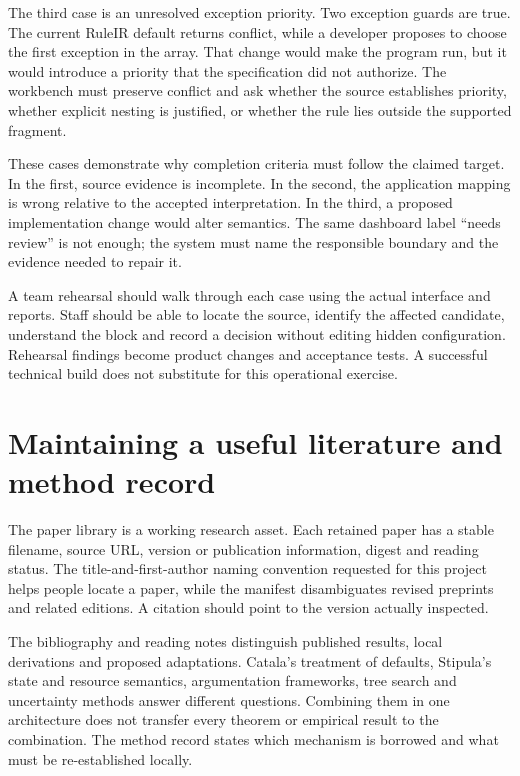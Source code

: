 \documentclass[12pt,a4paper,oneside,openany]{book}
\begin{document}
The third case is an unresolved exception priority. Two exception guards are
true. The current RuleIR default returns conflict, while a developer proposes to
choose the first exception in the array. That change would make the program run,
but it would introduce a priority that the specification did not authorize. The
workbench must preserve conflict and ask whether the source establishes priority,
whether explicit nesting is justified, or whether the rule lies outside the
supported fragment.

These cases demonstrate why completion criteria must follow the claimed target.
In the first, source evidence is incomplete. In the second, the application mapping
is wrong relative to the accepted interpretation. In the third, a proposed
implementation change would alter semantics. The same dashboard label ``needs
review'' is not enough; the system must name the responsible boundary and the
evidence needed to repair it.

A team rehearsal should walk through each case using the actual interface and
reports. Staff should be able to locate the source, identify the affected
candidate, understand the block and record a decision without editing hidden
configuration. Rehearsal findings become product changes and acceptance tests.
A successful technical build does not substitute for this operational exercise.

\section{Maintaining a useful literature and method record}
\label{merge:M10:13}


The paper library is a working research asset. Each retained paper has a stable
filename, source URL, version or publication information, digest and reading
status. The title-and-first-author naming convention requested for this project
helps people locate a paper, while the manifest disambiguates revised preprints
and related editions. A citation should point to the version actually inspected.

The bibliography and reading notes distinguish published results, local
derivations and proposed adaptations. Catala's treatment of defaults, Stipula's
state and resource semantics, argumentation frameworks, tree search and uncertainty
methods answer different questions. Combining them in one architecture does not
transfer every theorem or empirical result to the combination. The method record
states which mechanism is borrowed and what must be re-established locally.
\end{document}
